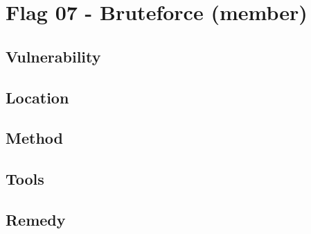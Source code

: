 \section{Flag 07 - Bruteforce (member)}

\begin{center}
\end{center}

\subsection{Vulnerability}

\subsection{Location}

\subsection{Method}

\subsection{Tools}

\subsection{Remedy}
